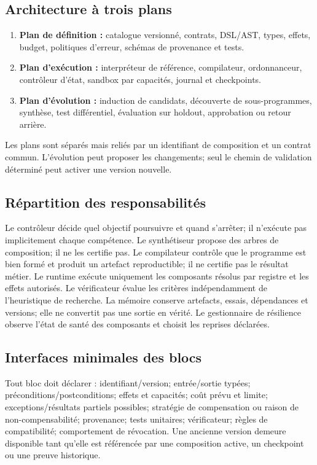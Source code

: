 \documentclass[11pt,a4paper]{article}
\theoremstyle{definition}
\theoremstyle{plain}
\theoremstyle{remark}
\begin{document}
\subsection{Architecture à trois plans}
\begin{enumerate}
\item \textbf{Plan de définition :} catalogue versionné, contrats, DSL/AST, types, effets, budget, politiques d'erreur, schémas de provenance et tests.
\item \textbf{Plan d'exécution :} interpréteur de référence, compilateur, ordonnanceur, contrôleur d'état, sandbox par capacités, journal et checkpoints.
\item \textbf{Plan d'évolution :} induction de candidats, découverte de sous-programmes, synthèse, test différentiel, évaluation sur holdout, approbation ou retour arrière.
\end{enumerate}
Les plans sont séparés mais reliés par un identifiant de composition et un contrat commun. L'évolution peut proposer les changements; seul le chemin de validation déterminé peut activer une version nouvelle.

\subsection{Répartition des responsabilités}
Le contrôleur décide quel objectif poursuivre et quand s'arrêter; il n'exécute pas implicitement chaque compétence. Le synthétiseur propose des arbres de composition; il ne les certifie pas. Le compilateur contrôle que le programme est bien formé et produit un artefact reproductible; il ne certifie pas le résultat métier. Le runtime exécute uniquement les composants résolus par registre et les effets autorisés. Le vérificateur évalue les critères indépendamment de l'heuristique de recherche. La mémoire conserve artefacts, essais, dépendances et versions; elle ne convertit pas une sortie en vérité. Le gestionnaire de résilience observe l'état de santé des composants et choisit les reprises déclarées.

\subsection{Interfaces minimales des blocs}
Tout bloc doit déclarer : identifiant/version; entrée/sortie typées; préconditions/postconditions; effets et capacités; coût prévu et limite; exceptions/résultats partiels possibles; stratégie de compensation ou raison de non-compensabilité; provenance; tests unitaires; vérificateur; règles de compatibilité; comportement de révocation. Une ancienne version demeure disponible tant qu'elle est référencée par une composition active, un checkpoint ou une preuve historique.
\end{document}
